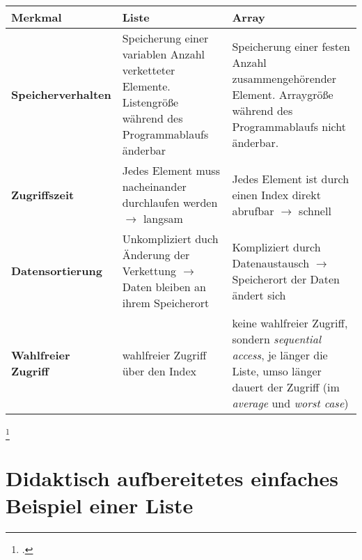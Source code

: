 \documentclass{lehramt-informatik-haupt}
\begin{document}
\begin{tabularx}{\linewidth}{|l|X|X|}

\hline
%

\textbf{Merkmal} & \textbf{Liste} & \textbf{Array}
\\
\hline\hline

%

\textbf{Speicherverhalten} &

Speicherung einer variablen Anzahl verketteter Elemente. Listengröße
während des Programmablaufs änderbar &

Speicherung einer festen Anzahl zusammengehörender Element. Arraygröße
während des Programmablaufs nicht änderbar.

\\
\hline

%

\textbf{Zugriffszeit} &

Jedes Element muss nacheinander durchlaufen werden $\rightarrow$ langsam
&

Jedes Element ist durch einen Index direkt abrufbar $\rightarrow$
schnell

\\
\hline

%

\textbf{Datensortierung} &

Unkompliziert duch Änderung der Verkettung $\rightarrow$
Daten bleiben an ihrem Speicherort &

Kompliziert durch Datenaustausch $\rightarrow$
Speicherort der Daten ändert sich

\\
\hline

\textbf{Wahlfreier Zugriff} &

wahlfreier Zugriff über den Index &

keine wahlfreier Zugriff, sondern \emph{sequential access}, je länger
die Liste, umso länger dauert der Zugriff (im \emph{average} und
\emph{worst case})

\end{tabularx}
\footcite[Seite 8]{aud:fs:4}

%

\section{Didaktisch aufbereitetes einfaches Beispiel einer Liste}
\end{document}
